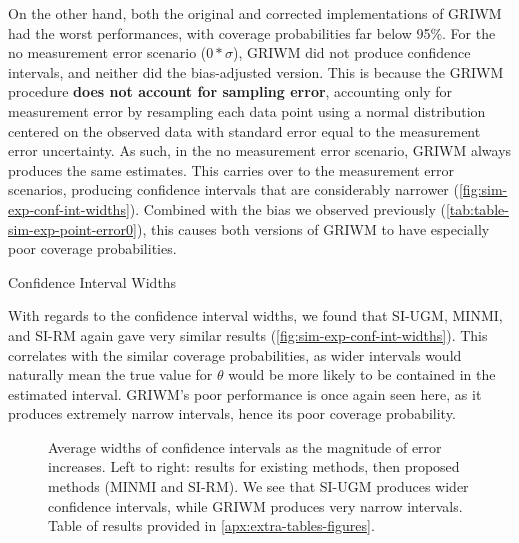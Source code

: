 On the other hand, both the original and corrected implementations of GRIWM had the worst performances, with coverage probabilities far below 95\%. For the no measurement error scenario ($0*\sigma$), GRIWM did not produce confidence intervals, and neither did the bias-adjusted version. This is because the GRIWM procedure \textbf{does not account for sampling error}, accounting only for measurement error by resampling each data point using a normal distribution centered on the observed data with standard error equal to the measurement error uncertainty. As such, in the no measurement error scenario, GRIWM always produces the same estimates. This carries over to the measurement error scenarios, producing confidence intervals that are considerably narrower (\autoref{fig:sim-exp-conf-int-widths}). Combined with the bias we observed previously (\autoref{tab:table-sim-exp-point-error0}), this causes both versions of GRIWM to have especially poor coverage probabilities.
\begin{table}[ht]
    \centering
    \caption{Confidence Interval Widths}
    
    \label{tab:table-sim-exp-width}
\end{table}

With regards to the confidence interval widths, we found that SI-UGM, MINMI, and SI-RM again gave very similar results (\autoref{fig:sim-exp-conf-int-widths}). This correlates with the similar coverage probabilities, as wider intervals would naturally mean the true value for $\theta$ would be more likely to be contained in the  estimated interval. GRIWM's poor performance is once again seen here, as it produces extremely narrow intervals, hence its poor coverage probability.
\begin{figure}[ht]
    \centering
    
    \caption{Average widths of confidence intervals as the magnitude of error increases. Left to right: results for existing methods, then proposed methods (MINMI and SI-RM). We see that SI-UGM produces wider confidence intervals, while GRIWM produces very narrow intervals. Table of results provided in \autoref{apx:extra-tables-figures}.}
    \label{fig:sim-exp-conf-int-widths}
\end{figure}

